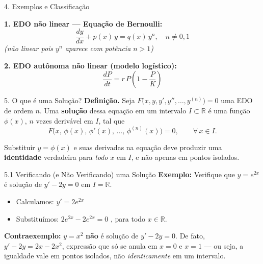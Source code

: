 \documentclass[11pt, aspectratio=169, xcolor=table]{beamer}
\begin{document}

\begin{frame}{4. Exemplos e Classificação}

\textbf{1. EDO não linear --- Equação de Bernoulli:}
\[
\frac{dy}{dx} + p(x)\,y = q(x)\,y^n, \quad n \neq 0, 1
\]
\textit{(não linear pois $y^n$ aparece com potência $n > 1$)}

\textbf{2. EDO autônoma não linear (modelo logístico):}
\[
\frac{dP}{dt} = r\,P\!\left(1 - \frac{P}{K}\right)
\]

\end{frame}


\begin{frame}{5. O que é uma Solução?}
\textbf{Definição.} Seja $F\bigl(x, y, y', y'', \ldots, y^{(n)}\bigr) = 0$ uma EDO de ordem $n$. Uma \textbf{solução} dessa equação em um intervalo $I \subset \mathbb{R}$ é uma função $\phi(x)$, $n$ vezes derivável em $I$, tal que
\[
F\bigl(x,\, \phi(x),\, \phi'(x),\, \ldots,\, \phi^{(n)}(x)\bigr) = 0, \qquad \forall\, x \in I.
\]

Substituir $y = \phi(x)$ e suas derivadas na equação deve produzir uma \textbf{identidade} verdadeira para \emph{todo} $x$ em $I$, e não apenas em pontos isolados.

\end{frame}

\begin{frame}{5.1 Verificando (e Não Verificando) uma Solução}
\textbf{Exemplo:} Verifique que $y = e^{2x}$ é solução de $y' - 2y = 0$ em $I = \mathbb{R}$.
\begin{itemize}
  \item Calculamos: $y' = 2e^{2x}$
  \item Substituímos: $2e^{2x} - 2e^{2x} = 0$ \checkmark, para todo $x \in \mathbb{R}$.
\end{itemize}

\vspace{0.3cm}
\textbf{Contraexemplo:} $y = x^2$ \textbf{não} é solução de $y' - 2y = 0$. De fato, $y' - 2y = 2x - 2x^2$, expressão que só se anula em $x=0$ e $x=1$ --- ou seja, a igualdade vale em pontos isolados, não \emph{identicamente} em um intervalo.

\end{frame}
\end{document}
